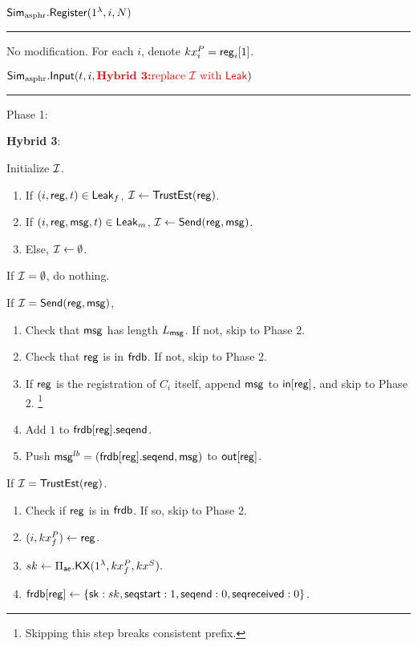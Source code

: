 \vspace{10pt}

$\mathbf{\mathsf{Sim}_{\text{asphr}}.\mathsf{Register}}(1^{\lambda}, i, N)$
\vspace{5pt}
\hrule
\vspace{5pt}
No modification. For each $i$, denote $kx^P_i = \mathsf{reg}_i[1]$.
\vspace{10pt}

$\mathbf{\mathsf{Sim}_{\text{asphr}}.\mathsf{Input}}(t, i, {\color{red} \textbf{Hybrid 3:} \text{replace $\mathcal{I}$ with $\mathsf{Leak}$}})$
\vspace{5pt}
\hrule
\vspace{5pt}
Phase 1: 

{
\color{red} 

\textbf{Hybrid 3}:

Initialize $\mathcal{I}$.

\begin{enumerate}
    \item If $(i, \mathsf{reg}, t) \in \mathsf{Leak}_f$, $\mathcal{I} \leftarrow \mathsf{TrustEst}(\mathsf{reg})$.
    \item If $(i, \mathsf{reg}, \mathsf{msg}, t) \in \mathsf{Leak}_m$, $\mathcal{I} \leftarrow \mathsf{Send}(\mathsf{reg}, \mathsf{msg})$.
    \item Else, $\mathcal{I} \leftarrow \emptyset$.
\end{enumerate}

}

If $\mathcal{I} = \emptyset$, do nothing. 

If $\mathcal{I} = \mathsf{Send}(\mathsf{reg}, \mathsf{msg})$, 

\begin{enumerate}
    \item Check that $\mathsf{msg}$ has length $L_{\mathsf{msg}}$. If not, skip to Phase 2.
    \item Check that $\mathsf{reg}$ is in $\mathsf{frdb}$. If not, skip to Phase 2.
    \item If $\mathsf{reg}$ is the registration of $C_i$ itself, append $\mathsf{msg}$ to $\mathsf{in}[\mathsf{reg}]$, and skip to Phase 2. \footnote{Skipping this step breaks consistent prefix.}
    \item Add $1$ to $\mathsf{frdb}[\mathsf{reg}].\mathsf{seqend}$. 
    \item Push $\mathsf{msg}^{lb} = (\mathsf{frdb}[\mathsf{reg}].\mathsf{seqend}, \mathsf{msg})$ to $\mathsf{out}[\mathsf{reg}]$.
\end{enumerate}

If $\mathcal{I} = \mathsf{TrustEst}(\mathsf{reg})$.
\begin{enumerate}
    \item Check if $\mathsf{reg}$ is in $\mathsf{frdb}$. If so, skip to Phase 2.
    \item $(i, kx_f^P) \leftarrow \mathsf{reg}$.
    \item $sk \leftarrow \Pi_{\mathsf{ae}}.\mathsf{KX}(1^{\lambda}, kx_f^P, kx^S).$
    \item $\mathsf{frdb}[\mathsf{reg}] \leftarrow \{{\mathsf{sk}}: sk,  \mathsf{seqstart}: 1, \mathsf{seqend}: 0, \mathsf{seqreceived}: 0\}$.
\end{enumerate}

